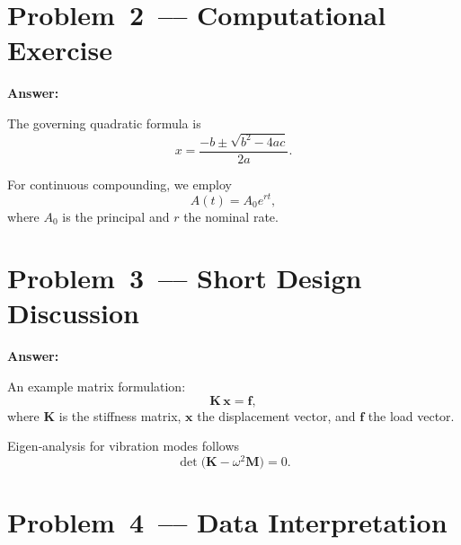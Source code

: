 \documentclass[12pt]{article}
\newenvironment{problem}{\color{dodblue}\itshape}{\par}
\begin{document}
\section*{Problem 2 –– Computational Exercise}
\begin{problem}
\lipsum[3]
\end{problem}

\textbf{Answer:}\\
\lipsum[4]

The governing quadratic formula is
\begin{equation}
\label{eq:quadratic}
x = \frac{-b \pm \sqrt{b^{2}-4ac}}{2a}.
\end{equation}

For continuous compounding, we employ
\begin{equation}
\label{eq:exp}
A(t) = A_0 e^{rt},
\end{equation}
where $A_0$ is the principal and $r$ the nominal rate.

\section*{Problem 3 –– Short Design Discussion}
\begin{problem}
\lipsum[5]
\end{problem}

\textbf{Answer:}\\
\lipsum[6]

An example matrix formulation:
\begin{equation}
\mathbf{K}\,\mathbf{x} = \mathbf{f},
\end{equation}
where $\mathbf{K}$ is the stiffness matrix, $\mathbf{x}$ the displacement vector, and $\mathbf{f}$ the load vector.

Eigen‑analysis for vibration modes follows
\begin{equation}
\det\bigl(\mathbf{K} - \omega^{2}\mathbf{M}\bigr) = 0.
\end{equation}

\section*{Problem 4 –– Data Interpretation}
\begin{problem}
\lipsum[7]
\end{problem}
\end{document}
